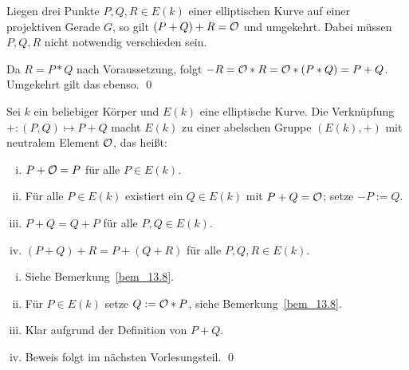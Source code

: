 \begin{lemma}
\label{lemma_13.9}
	Liegen drei Punkte $P,Q,R \in E(k)$ einer elliptischen Kurve auf einer projektiven Gerade $G$, so gilt $(P+Q) + R = \mathcal{O}$ und umgekehrt. Dabei müssen $P,Q,R$ nicht notwendig verschieden sein.
\end{lemma}

	Da $R = P *Q$ nach Voraussetzung, folgt $-R = \mathcal{O} * R = \mathcal{O} * (P * Q) = P+Q$. Umgekehrt gilt das ebenso. \qed
	
\begin{satz}
	Sei $k$ ein beliebiger Körper und $E(k)$ eine elliptische Kurve. Die Verknüpfung $+ \colon (P,Q) \mapsto P +Q$ macht $E(k)$ zu einer abelschen Gruppe $(E(k),+)$ mit neutralem Element $\mathcal{O}$, das heißt:
	\begin{enumerate}[(i)]
		\item $P+\mathcal{O} = P$ für alle $P \in E(k)$.
		\item Für alle $P \in E(k)$ existiert ein $Q \in E(k)$ mit $P+Q = \mathcal{O}$; setze $-P := Q$.
		\item $P + Q = Q + P$ für alle $P,Q \in E(k)$.
		\item $(P+Q) + R = P+(Q+R)$ für alle $P,Q,R \in E(k)$.
	\end{enumerate}
\end{satz}

	\begin{enumerate}[(i)]
		\item Siehe Bemerkung~\ref{bem_13.8}.
		\item Für $P \in E(k)$ setze $Q := \mathcal{O} * P$, siehe Bemerkung~\ref{bem_13.8}.
		\item Klar aufgrund der Definition von $P+Q$.
		\item Beweis folgt im nächsten Vorlesungsteil. \qed
	\end{enumerate}
	
